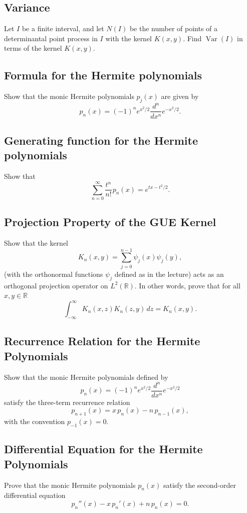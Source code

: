 \documentclass[letterpaper,11pt,oneside,reqno]{book}
\numberwithin{equation}{chapter}  %
\newcommand{\ssp}{\hspace{1pt}}
\theoremstyle{definition}
\begin{document}
\subsection{Variance}

Let $I$ be a finite interval,
and let $N(I)$ be the number of points of a determinantal point process in $I$
with the kernel $K(x,y)$.
Find $\operatorname{Var}(I)$
in terms of the kernel $K(x,y)$.


\subsection{Formula for the Hermite polynomials}

Show that the monic Hermite polynomials \(p_j(x)\) are given by
\begin{equation*}
	p_n(x)=(-1)^n e^{x^2/2}\frac{d^n}{dx^n}e^{-x^2/2}.
\end{equation*}

\subsection{Generating function for the Hermite polynomials}

Show that
\begin{equation*}
	\sum_{n=0}^\infty \frac{t^n}{n!} \ssp p_n(x)=e^{tx-t^2/2}.
\end{equation*}


\subsection{Projection Property of the GUE Kernel}
Show that the kernel
\[
K_n(x,y)=\sum_{j=0}^{n-1}\psi_j(x)\psi_j(y),
\]
(with the orthonormal functions \(\psi_j\) defined as in the lecture) acts as an orthogonal projection operator on \(L^2(\mathbb{R})\). In other words, prove that for all \(x,y\in\mathbb{R}\)
\[
\int_{-\infty}^\infty K_n(x,z)K_n(z,y)\,dz = K_n(x,y).
\]


\subsection{Recurrence Relation for the Hermite Polynomials}
Show that the monic Hermite polynomials defined by
\[
	p_n(x)=(-1)^n e^{x^2/2}\frac{d^n}{dx^n}e^{-x^2/2}
\]
satisfy the three-term recurrence relation
\[
p_{n+1}(x)=x\,p_n(x)-n\,p_{n-1}(x),
\]
with the convention \(p_{-1}(x)=0\).

\subsection{Differential Equation for the Hermite Polynomials}
Prove that the monic Hermite polynomials \(p_n(x)\) satisfy the second-order differential equation
\[
p_n''(x)-x\,p_n'(x)+n\,p_n(x)=0.
\]
\end{document}

